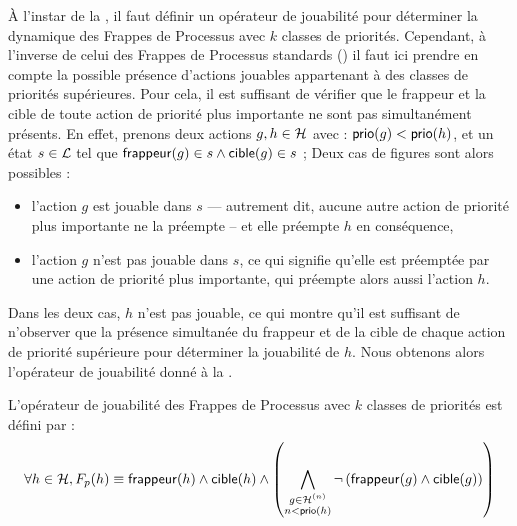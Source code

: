 À l'instar de la , il faut définir un opérateur de jouabilité
pour déterminer la dynamique des Frappes de Processus avec $k$ classes de priorités.
Cependant, à l'inverse de celui des Frappes de Processus standards ()
il faut ici prendre en compte la possible présence d'actions jouables appartenant à des
classes de priorités supérieures.
Pour cela, il est suffisant de vérifier que le frappeur et la cible de toute action
de priorité plus importante ne sont pas simultanément présents.
En effet, prenons deux actions $g, h \in \mathcal{H}$ avec : $\mathsf{prio}(g) < \mathsf{prio}(h)$, et
un état $s \in \mathcal{L}$ tel que $\mathsf{frappeur}(g) \in s \wedge \mathsf{cible}(g) \in s$ ;
Deux cas de figures sont alors possibles :
\begin{itemize}
  \item l'action $g$ est jouable dans $s$ --- autrement dit, aucune autre action de priorité plus
    importante ne la préempte -- et elle préempte $h$ en conséquence,
  \item l'action $g$ n'est pas jouable dans $s$, ce qui signifie qu'elle est préemptée par une
    action de priorité plus importante, qui préempte alors aussi l'action $h$.
\end{itemize}
Dans les deux cas, $h$ n'est pas jouable, ce qui montre qu'il est suffisant de n'observer
que la présence simultanée du frappeur et de la cible de chaque action de priorité supérieure
pour déterminer la jouabilité de $h$.
Nous obtenons alors l'opérateur de jouabilité donné à la .

\begin{definition}
  L'opérateur de jouabilité des Frappes de Processus avec $k$ classes de priorités est défini par :
  \[\forall h \in \mathcal{H}, F_{p}(h) \equiv \mathsf{frappeur}(h) \wedge \mathsf{cible}(h) \wedge
    \left( \bigwedge_{\substack{g \in \mathcal{H}^{(n)}\\n < \mathsf{prio}(h)}}
    \neg \left( \mathsf{frappeur}(g) \wedge \mathsf{cible}(g) \right) \right)\]
\end{definition}



